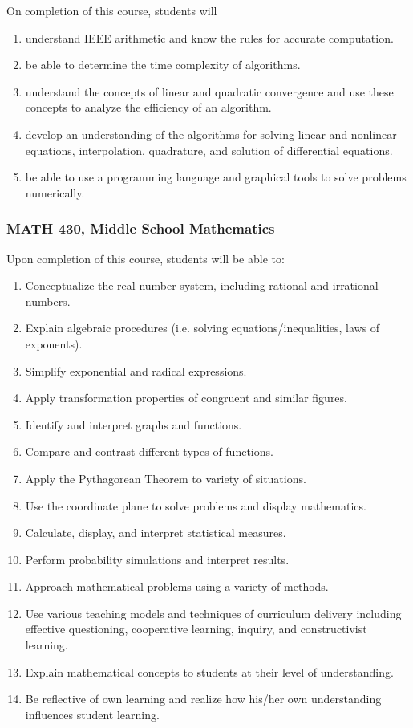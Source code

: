 \documentclass[11pt]{article}
\newenvironment{alphalist}{
\begin{enumerate}[label=(\arabic*),widest=107 ,leftmargin=25pt, itemsep=0pt]}
{\end{enumerate}}
\begin{document}
On completion of this course, students will
\begin{alphalist}
    \item understand IEEE arithmetic and know the rules for accurate computation.
    \item be able to determine the time complexity of algorithms.
    \item understand the concepts of linear and quadratic convergence and use these concepts to analyze the efficiency of an algorithm.
    \item develop an understanding of the algorithms for solving linear and nonlinear equations, interpolation, 
       quadrature, and solution of differential equations.
    \item be able to use a programming language and graphical tools to solve problems numerically.
\end{alphalist}

\subsubsection*{MATH 430,  Middle School Mathematics}

Upon completion of this course, students will be able to: 
\begin{alphalist}
\item Conceptualize the real number system, including rational and irrational numbers. 
\item Explain algebraic procedures (i.e. solving equations/inequalities, laws of exponents). 
\item Simplify exponential and radical expressions. 
\item Apply transformation properties of congruent and similar figures. 
\item Identify and interpret graphs and functions. 
\item Compare and contrast different types of functions. 
\item Apply the Pythagorean Theorem to variety of situations. 
\item Use the coordinate plane to solve problems and display mathematics. 
\item Calculate, display, and interpret statistical measures. 
\item Perform probability simulations and interpret results. 
\item Approach mathematical problems using a variety of methods. 
\item Use various teaching models and techniques of curriculum delivery including effective questioning, cooperative learning, inquiry, and constructivist learning. 
\item Explain mathematical concepts to students at their level of understanding. 
\item Be reflective of own learning and realize how his/her own understanding influences student learning.
\end{alphalist}
\end{document}
